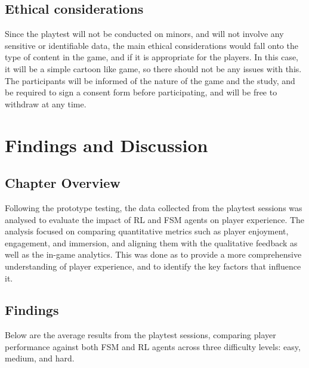 \documentclass[conference]{IEEEtran}
\begin{document}
\subsection{Ethical considerations}

Since the playtest will not be conducted on minors, and will not involve any sensitive or identifiable data, the main ethical considerations
would fall onto the type of content in the game, and if it is appropriate for the players. In this case, it will be a simple cartoon like game,
so there should not be any issues with this. The participants will be informed of the nature of the game and the study, and be required to
sign a consent form before participating, and will be free to withdraw at any time.

\section{Findings and Discussion}

\subsection{Chapter Overview}
Following the prototype testing, the data collected from the playtest sessions was analysed to evaluate the impact of RL and FSM agents on player experience.
The analysis focused on comparing quantitative metrics such as player enjoyment, engagement, and immersion, and aligning them with the qualitative feedback as well as the in-game analytics.
This was done as to provide a more comprehensive understanding of player experience, and to identify the key factors that influence it.

\subsection{Findings}

Below are the average results from the playtest sessions, comparing player performance against both FSM and RL agents across three difficulty levels: easy, medium, and hard.
\end{document}
